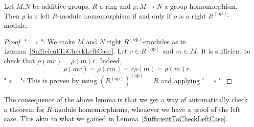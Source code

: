 \begin{lemma}
    Let $M$,$N$ be additive groups, $R$ a ring and $\rho : M \rightarrow N$ a group homomorphism. Then $\rho$ is a left $R$-module homomorphism if and only if $\rho$ is a right $R^{(\text{op})}$-module. 
\end{lemma}
\begin{proof}
    "$\implies$": We make $M$ and $N$ right $R^{(\text{op})}$-modules as in Lemma~\ref{SufficientToCheckLeftCase}. Let $r\in R^{(\text{op})}$ and $m\in M$. It is sufficient to check that $\rho(mr)=\rho(m)r$. Indeed, 
    $$\rho(mr) = \rho(rm) = r\rho(m) = \rho(m)r.$$
    "$\impliedby$": This is proven by using $\left(R^{(\text{op})}\right)^{(\text{op})}=R$ and applying "$\implies$".
\end{proof}
The consequence of the above lemma is that we get a way of automatically check a theorem for $R$-module homomorphisms, whenever we have a proof of the left case. This akin to what we gained in Lemma~\ref{SufficientToCheckLeftCase}.

